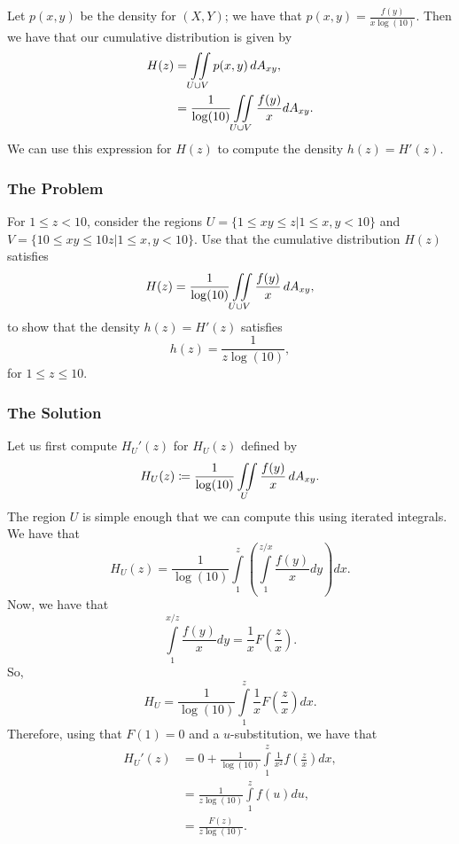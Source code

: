 Let \(p(x,y)\) be the density for \((X, Y)\); we have that \(p(x,y) = \frac{f(y)}{x\log(10)}\). Then we have that our cumulative distribution is given by
\begin{align}
H(z) & = \iint\limits_{U\cup V} p(x,y) \, dA_{xy}, \\ 
& = \frac{1}{\log(10)} \iint \limits_{U\cup V} \frac{f(y)}{x}  dA_{xy}.
\end{align}
We can use this expression for \(H(z)\) to compute the density \(h(z) = H'(z)\).

\subsubsection*{The Problem}

For \(1 \leq z < 10\), consider the regions \(U = \{1 \leq xy \leq z | 1 \leq x, y < 10 \}\) and \(V = \{10 \leq xy \leq 10z | 1 \leq x, y < 10\}\). Use that the
cumulative distribution \(H(z)\) satisfies 
\begin{equation}
H(z) = \frac{1}{\log(10)} \iint\limits_{U \cup V} \frac{f(y)}{x} \, dA_{xy}, 
\end{equation}
to show that the density \(h(z) = H'(z)\) satisfies
\begin{equation}
h(z) = \frac{1}{z\log(10)},
\end{equation}
for \(1 \leq z \leq 10\).

\subsubsection*{The Solution}

Let us first compute \(H_U'(z)\) for \(H_U(z)\) defined by
\begin{equation}
H_U(z) \coloneqq \frac{1}{\log(10)} \iint\limits_U \frac{f(y)}{x}\, dA_{xy}. 
\end{equation}
The region \(U\) is simple enough that we can compute this using iterated integrals. We have that
\begin{equation}
H_U(z) = \frac{1}{\log(10)}\int\limits_{1}^{z} \left( \int\limits_{1}^{z/x} \frac{f(y)}{x} dy\right) dx. 
\end{equation}
Now, we have that
\begin{equation}
\int\limits_{1}^{x/z} \frac{f(y)}{x} dy = \frac{1}{x} F\left(\frac{z}{x}\right).
\end{equation}
So,
\begin{equation}
H_U = \frac{1}{\log(10)}\int\limits_1^z \frac{1}{x} F\left(\frac{z}{x}\right) dx. 
\end{equation}
Therefore, using that \(F(1) = 0\) and a \(u\)-substitution, we have that
\begin{align}
H_U'(z) & = 0 + \frac{1}{\log(10)} \int\limits_1^z \frac{1}{x^2} f\left(\frac{z}{x}\right) dx, \\ 
    & = \frac{1}{z\log(10)} \int\limits_1^{z} f(u) du, \\
& = \frac{F(z)}{z\log(10)}.
\end{align}

